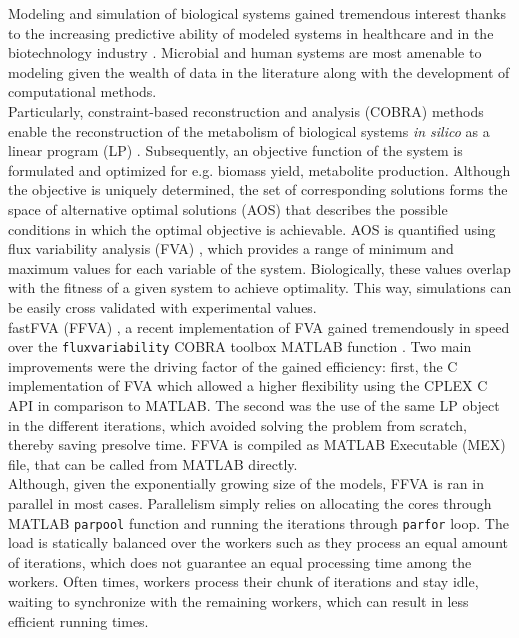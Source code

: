 \documentclass[letterpaper, 10 pt, conference]{ieeeconf}  %
\begin{document}
Modeling and simulation of biological systems gained tremendous interest thanks to the increasing predictive ability of modeled systems in healthcare and in the biotechnology industry . Microbial and human systems are most amenable to modeling given the wealth of data in the literature along with the development of computational methods. \\
Particularly, constraint-based reconstruction and analysis (COBRA) methods enable the reconstruction of the metabolism of biological systems \textit{in silico} as a linear program (LP) \cite{o2015using}. Subsequently, an objective function of the system is formulated and optimized for e.g. biomass yield, metabolite production. Although the objective is uniquely determined, the set of corresponding solutions forms the space of alternative optimal solutions (AOS) that describes the possible conditions in which the optimal objective is achievable. AOS is quantified using flux variability analysis (FVA) \cite{mahadevan2003effects}, which provides a range of minimum and maximum values for each variable of the system. Biologically, these values overlap with the fitness of a given system to achieve optimality. This way, simulations can be easily cross validated with experimental values.\\
fastFVA (FFVA) \cite{gudmundsson2010computationally}, a recent implementation of FVA gained tremendously in speed over the \texttt{fluxvariability} COBRA toolbox MATLAB function \cite{becker2007quantitative}. Two main improvements were the driving factor of the gained efficiency: first, the C implementation of FVA which allowed a higher flexibility using the CPLEX C API in comparison to MATLAB. The second was the use of the same LP object in the different iterations, which avoided solving the problem from scratch, thereby saving presolve time. FFVA is compiled as MATLAB Executable (MEX) file, that can be called from MATLAB directly.\\
Although, given the exponentially growing size of the models, FFVA is ran in parallel in most cases. Parallelism simply relies on allocating the cores through MATLAB \texttt{parpool} function and running the iterations through \texttt{parfor} loop. The load is statically balanced over the workers such as they process an equal amount of iterations, which does not guarantee an equal processing time among the workers. Often times, workers process their chunk of iterations and stay idle, waiting to synchronize with the remaining workers, which can result in less efficient running times.
\end{document}
